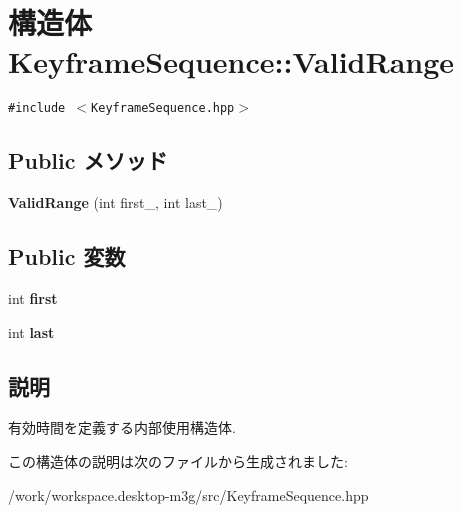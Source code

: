 \hypertarget{structm3g_1_1KeyframeSequence_1_1ValidRange}{
\section{構造体 KeyframeSequence::ValidRange}
\label{structm3g_1_1KeyframeSequence_1_1ValidRange}
}
{\tt \#include $<$KeyframeSequence.hpp$>$}

\subsection*{Public メソッド}
\begin{CompactItemize}
\item 
\hypertarget{structm3g_1_1KeyframeSequence_1_1ValidRange_d9ada86c9bba00101977e5f3f456b9ce}{
\textbf{ValidRange} (int first\_\-, int last\_\-)}
\label{structm3g_1_1KeyframeSequence_1_1ValidRange_d9ada86c9bba00101977e5f3f456b9ce}

\end{CompactItemize}
\subsection*{Public 変数}
\begin{CompactItemize}
\item 
\hypertarget{structm3g_1_1KeyframeSequence_1_1ValidRange_6c8ec3c3e77241328358d43697f6f840}{
int \textbf{first}}
\label{structm3g_1_1KeyframeSequence_1_1ValidRange_6c8ec3c3e77241328358d43697f6f840}

\item 
\hypertarget{structm3g_1_1KeyframeSequence_1_1ValidRange_72e27dee31b1c4c6a504fbed29542d97}{
int \textbf{last}}
\label{structm3g_1_1KeyframeSequence_1_1ValidRange_72e27dee31b1c4c6a504fbed29542d97}

\end{CompactItemize}


\subsection{説明}
有効時間を定義する内部使用構造体. 

この構造体の説明は次のファイルから生成されました:\begin{CompactItemize}
\item 
/work/workspace.desktop-m3g/src/KeyframeSequence.hpp\end{CompactItemize}
